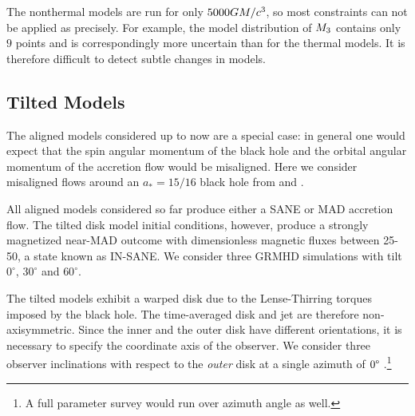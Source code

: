 



The nonthermal models are run for only $5000GM/c^3$, so most  constraints can not be applied as precisely.  For example, the model distribution of $M_{3}$ contains only $9$ points and is correspondingly more uncertain than for the thermal models.  It is therefore difficult to detect subtle changes in models.

\subsection{Tilted Models}

The aligned models considered up to now are a special case: in general one would expect that the spin angular momentum of the black hole and the orbital angular momentum of the accretion flow would be misaligned. Here we consider misaligned flows around an $a_*=15/16$ black hole from \citet{Liska2018} and \citet{Chatterjee2020}.

All aligned models considered so far produce either a SANE or MAD accretion flow.  The tilted disk model initial conditions, however, produce a strongly magnetized near-MAD outcome with dimensionless magnetic fluxes between 25-50, a state known as IN-SANE.  We consider three GRMHD simulations with tilt $0^{\circ}$, $30^{\circ}$ and $60^{\circ}$.

The tilted models exhibit a warped disk due to the Lense-Thirring torques imposed by the black hole.  The time-averaged disk and jet are therefore non-axisymmetric.
Since the inner and the outer disk have different orientations, it is necessary to specify the coordinate axis of the observer.  We consider three  observer inclinations with respect to the {\em outer} disk at a single azimuth of $0\degree$ \citep[for more details, see][]{Chatterjee2020}.\footnote{A full parameter survey would run over azimuth angle as well.}  

